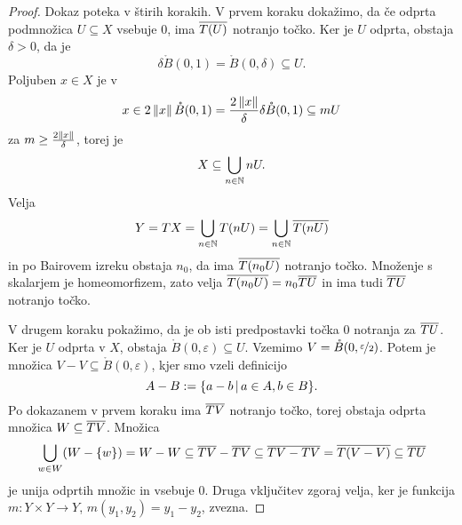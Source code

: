 \begin{proof}
  Dokaz poteka v štirih korakih.
  V prvem koraku dokažimo, da če odprta podmnožica $U \subseteq X$ vsebuje $0$,
  ima $\overline{T(U)}$ notranjo točko.
  Ker je $U$ odprta, obstaja $\delta > 0$, da je
  \[
	\delta \mathring{B}(0, 1) = \mathring{B}(0,\delta) \subseteq U.
  \]
  Poljuben $x \in X$ je v
  \[
	x \in 2 \left\lVert x\right\rVert \mathring{B}(0,1)
	= \frac{2 \left\lVert x\right\rVert}{\delta} \delta \mathring{B}(0,1) \subseteq m U
  \]
  za $m \ge \frac{2 \left\lVert x\right\rVert}{\delta}$, torej je
  \[
	X \subseteq \bigcup_{n \in \mathbb{N}} n U.
  \]
  Velja
  \[
	Y = TX = \bigcup_{n \in \mathbb{N}} T(n U)
	= \bigcup_{n \in \mathbb{N}} \overline{T(n U)}
  \]
  in po Bairovem izreku obstaja $n_0$, da ima $\overline{T(n_0 U)}$ notranjo točko.
  Množenje s skalarjem je homeomorfizem, zato velja $\overline{T(n_0 U)} = n_0
  \overline{TU}$ in ima tudi $\overline{TU}$ notranjo točko.

  V drugem koraku pokažimo, da je ob isti predpostavki točka $0$ notranja za
  $\overline{TU}$.
  Ker je $U$ odprta v $X$, obstaja $\mathring{B}(0,\varepsilon) \subseteq U$.
  Vzemimo $V = \mathring{B}(0, \nicefrac{\varepsilon}{2})$.
  Potem je množica $V - V \subseteq \mathring{B}(0, \varepsilon)$, kjer smo
  vzeli definicijo
  \[
	A - B := \{ a - b \,|\, a \in A, b \in B \}.
  \]
  Po dokazanem v prvem koraku ima $\overline{TV}$ notranjo točko, torej obstaja odprta
  množica $W \subseteq \overline{TV}$.
  Množica
  \[
	\bigcup_{w \in W} (W - \{w\}) = W - W
	\subseteq \overline{TV} - \overline{TV}
	\subseteq \overline{TV - TV}
	= \overline{T(V - V)}
	\subseteq \overline{TU}
  \]
  je unija odprtih množic in vsebuje $0$.
  Druga vključitev zgoraj velja, ker je funkcija $m: Y \times Y \to Y$, $m(y_1,
  y_2) = y_1 - y_2$, zvezna.
\end{proof}

